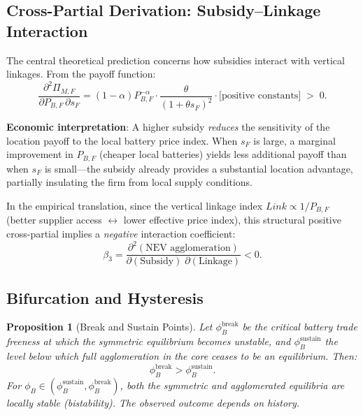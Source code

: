 \documentclass[11pt,a4paper]{article}
\newtheorem{proposition}{Proposition}[section]
\newcommand{\fB}{\phi_B}
\newcommand{\tht}{\theta}
\begin{document}
\subsection{Cross-Partial Derivation: Subsidy--Linkage Interaction}

The central theoretical prediction concerns how subsidies interact with vertical linkages. From the payoff function:
\begin{equation}\label{eq:cross_intuition}
    \frac{\partial^2 \Pi_{M,F}}{\partial P_{B,F} \, \partial s_F}
    = (1-\alpha) P_{B,F}^{-\alpha} \cdot
      \frac{\tht}{(1+\tht s_F)^2} \cdot \text{[positive constants]} \;>\; 0.
\end{equation}

\textbf{Economic interpretation}: A higher subsidy \textit{reduces} the sensitivity of the location payoff to the local battery price index. When $s_F$ is large, a marginal improvement in $P_{B,F}$ (cheaper local batteries) yields less additional payoff than when $s_F$ is small---the subsidy already provides a substantial location advantage, partially insulating the firm from local supply conditions.

In the empirical translation, since the vertical linkage index $Link \propto 1/P_{B,F}$ (better supplier access $\leftrightarrow$ lower effective price index), this structural positive cross-partial implies a \textit{negative} interaction coefficient:
\begin{equation}
    \boxed{\beta_3 = \frac{\partial^2 (\text{NEV agglomeration})}{\partial (\text{Subsidy}) \; \partial (\text{Linkage})} < 0 }.
\end{equation}

\subsection{Bifurcation and Hysteresis}

\begin{proposition}[Break and Sustain Points]\label{prop:hysteresis}
Let $\fB^{\text{break}}$ be the critical battery trade freeness at which the symmetric equilibrium becomes unstable, and $\fB^{\text{sustain}}$ the level below which full agglomeration in the core ceases to be an equilibrium. Then:
\begin{equation}
    \fB^{\text{break}} > \fB^{\text{sustain}}.
\end{equation}
For $\fB \in (\fB^{\text{sustain}}, \fB^{\text{break}})$, both the symmetric and agglomerated equilibria are locally stable (bistability). The observed outcome depends on history.
\end{proposition}
\end{document}
